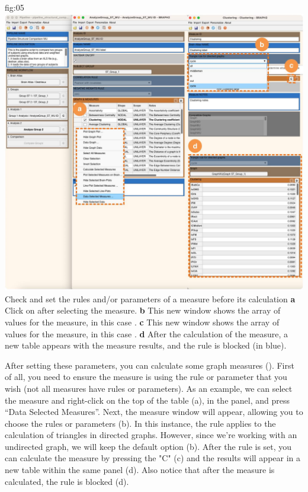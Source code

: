 \documentclass[justified]{tufte-handout}
\begin{document}
	{fig:05}
	{
	\includegraphics{fig05.jpg}
	}
	{Check and set the rules and/or parameters of a measure before its calculation}
	{
	{\bf a} Click on  after selecting the measure.
	{\bf b} This new window shows the array of values for the measure, in this case .
 	{\bf c} This new window shows the array of values for the measure, in this case .
  	{\bf d} After the calculation of the measure, a new table appears with the measure results, and the rule is blocked (in blue).
	}
 
 After setting these parameters, you can calculate some graph measures (). First of all, you need to ensure the measure is using the rule or parameter that you wish (not all measures have rules or parameters). As an example, we can select the measure  and right-click on the top of the table (a), in the  panel, and press “Data Selected Measures”. 
 Next, the measure window will appear, allowing you to choose the rules or parameters (b). In this instance, the rule applies to the calculation of triangles in directed graphs. However, since we're working with an undirected graph, we will keep the default option (b).
After the rule is set, you can calculate the measure by pressing the "C" (c) and the results will appear in a new table within the same panel (d). Also notice that after the measure is calculated, the rule is blocked (d).
 
\end{document}
